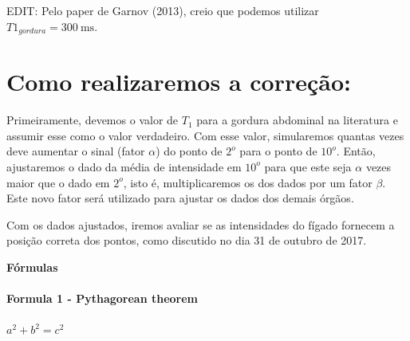 \documentclass[idxtotoc,hyperref,openany]{labbook} %
\begin{document}
EDIT: Pelo paper de Garnov (2013), creio que podemos utilizar $T1_{gordura}=\SI{300}{\milli \second}$.

 \section*{Como realizaremos a correção:}
 
  Primeiramente, devemos o valor de $T_1$ para a gordura abdominal na literatura e assumir esse como o valor verdadeiro. Com esse valor, simularemos quantas vezes deve aumentar o sinal (fator $\alpha$) do ponto de $2^o$ para o ponto de $10^o$. Então, ajustaremos o dado da média de intensidade em $10^o$ para que este seja $\alpha$ vezes maior que o dado em $2^o$, isto é, multiplicaremos os dos dados por um fator $\beta$. Este novo fator será utilizado para ajustar os dados dos demais órgãos.
  
  Com os dados ajustados, iremos avaliar se as intensidades do fígado fornecem a posição correta dos pontos, como discutido no dia 31 de outubro de 2017. 


\newpage

\huge \textbf{Fórmulas} \\ \\

\normalsize \textbf{Formula 1 - Pythagorean theorem}\\ \\
$a^2 + b^2 = c^2$\\ \\




\end{document}
